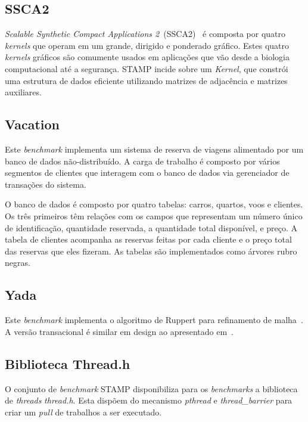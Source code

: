 \documentclass[diss,capa]{texufpel}
\begin{document}
\subsection{SSCA2}

\emph{Scalable Synthetic Compact Applications 2}~(SSCA2)~\cite{Bader05} é composta por quatro \emph{kernels} que operam em um grande, dirigido e ponderado gráfico. Estes quatro \emph{kernels} gráficos são comumente usados em aplicações que vão desde a biologia computacional até a segurança. STAMP incide sobre um \emph{Kernel}, que constrói uma estrutura de dados eficiente utilizando matrizes de adjacência e matrizes auxiliares.


\subsection{Vacation}

Este \emph{benchmark} implementa um sistema de reserva de viagens alimentado por um banco de dados não-distribuído. A carga de trabalho é composto por vários segmentos de clientes que interagem com o banco de dados via gerenciador de transações do sistema.

O banco de dados é composto por quatro tabelas: carros, quartos, voos e clientes. Os três primeiros têm relações com os campos que representam um número único de identificação, quantidade reservada, a quantidade total disponível, e preço. A tabela de clientes acompanha as reservas feitas por cada cliente e o preço total das reservas que eles fizeram. As tabelas são implementados como árvores rubro negras.


\subsection{Yada}

Este \emph{benchmark} implementa o algoritmo de Ruppert para refinamento de malha~\cite{Ruppert95}. A versão transacional é similar em design ao apresentado em~\cite{Kulkarni06}.

\subsection{Biblioteca Thread.h}

O conjunto de \emph{benchmark} STAMP disponibiliza para os \emph{benchmarks} a biblioteca de \emph{threads} \emph{thread.h}. Esta dispõem do mecanismo \emph{pthread} e \emph{thread\_barrier} para criar um \emph{pull} de trabalhos a ser executado.
\end{document}
